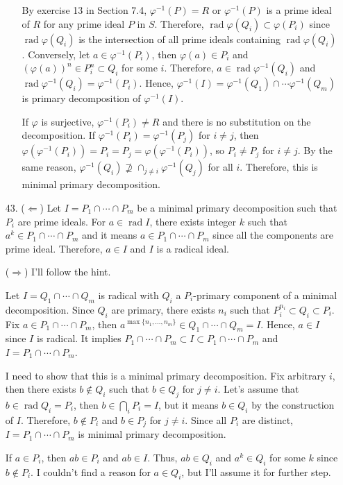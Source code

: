 \documentclass[12pt]{article}
\DeclareMathOperator{\rad}{\mathrm{rad}}
\begin{document}
\begin{enumerate}
\begin{enumerate}
By exercise 13 in Section 7.4, $\varphi^{-1}(P)=R$ or $\varphi^{-1}(P)$ is a prime ideal of $R$ for any prime ideal $P$ in $S$. Therefore, $\rad\varphi(Q_i)\subset \varphi(P_i)$ since $\rad\varphi(Q_i)$ is the intersection of all prime ideals containing $\rad\varphi(Q_i)$. Conversely, let $a\in \varphi^{-1}(P_i)$, then $\varphi(a)\in P_i$ and $\left(\varphi(a)\right)^n\in P_i^n \subset Q_i$ for some $i$. Therefore, $a\in \rad\varphi^{-1}(Q_i)$ and $\rad\varphi^{-1}(Q_i)=\varphi^{-1}(P_i)$. Hence, $\varphi^{-1}(I)=\varphi^{-1}(Q_1)\cap \cdots\varphi^{-1}(Q_m)$ is primary decomposition of $\varphi^{-1}(I)$. 

If $\varphi$ is surjective, $\varphi^{-1}(P_i)\neq R$ and there is no substitution on the decomposition. If $\varphi^{-1}(P_i)=\varphi^{-1}(P_j)$ for $i\neq j$, then $\varphi(\varphi^{-1}(P_i))=P_i=P_j=\varphi(\varphi^{-1}(P_i))$, so $P_i\neq P_j$ for $i\neq j$. By the same reason, $\varphi^{-1}(Q_i)\nsupseteq \cap_{j\neq i}\varphi^{-1}(Q_j)$ for all $i$. Therefore, this is minimal primary decomposition.
\end{enumerate}
\newpage
\item[43.]
($\Leftarrow$) Let $I=P_1\cap \cdots \cap P_m$ be a minimal primary decomposition such that $P_i$ are prime ideals. For $a\in \rad I$, there exists integer $k$ such that $a^k\in P_1\cap \cdots \cap P_m$ and it means $a\in P_1\cap \cdots \cap P_m$ since all the components are prime ideal. Therefore, $a\in I$ and $I$ is a radical ideal.

($\Rightarrow$) I'll follow the hint.

Let $I=Q_1\cap \cdots \cap Q_m$ is radical with $Q_i$ a $P_i$-primary component of a minimal decomposition. Since $Q_i$ are primary, there exists $n_i$ such that $P_i^{n_i}\subset Q_i\subset P_i$. Fix $a\in P_1\cap \cdots \cap P_m$, then $a^{\max\{n_1, \ldots, n_m\}}\in Q_1\cap \cdots\cap Q_m=I$. Hence, $a\in I$ since $I$ is radical. It implies $P_1\cap \cdots \cap P_m \subset I \subset P_1\cap \cdots \cap P_m$ and $I=P_1\cap \cdots \cap P_m$.

I need to show that this is a minimal primary decomposition. Fix arbitrary $i$, then there exists $b\notin Q_i$ such that $b\in Q_j$ for $j\neq i$. Let's assume that $b\in \rad Q_i=P_i$, then $b\in \bigcap_{i} P_i=I$, but it means $b\in Q_i$ by the construction of $I$. Therefore, $b\notin P_i$ and $b\in P_j$ for $j\neq i$. Since all $P_i$ are distinct, $I=P_1\cap \cdots \cap P_m$ is minimal primary decomposition. 

If $a\in P_i$, then $ab\in P_i$ and $ab\in I$. Thus, $ab\in Q_i$ and $a^k \in Q_i$ for some $k$ since $b\notin P_i$. I couldn't find a reason for $a\in Q_i$, but I'll assume it for further step.


\end{enumerate}
\end{document}
